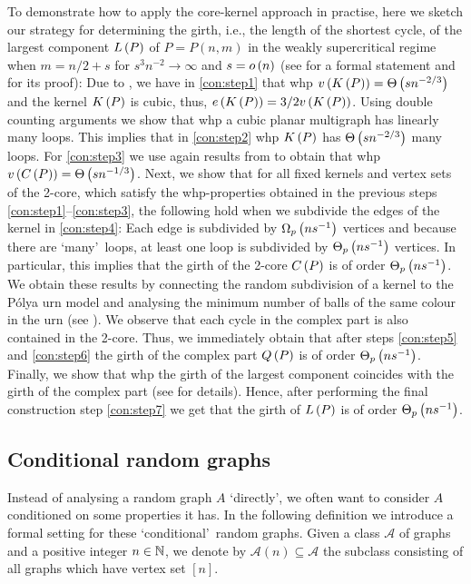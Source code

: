 To demonstrate how to apply the core-kernel approach in practise, here we sketch our strategy for determining the girth, i.e., the length of the shortest cycle, of the largest component $L\left(P\right)$ of $P=P(n,m)$ in the weakly supercritical regime when $m=n/2+s$ for $s^3n^{-2}\to \infty$ and $s=o\left(n\right)$ (see  for a formal statement and  for its proof): Due to \cite{KangLuczak2012,KangMosshammerSpruessel2020}, we have in \ref{con:step1} that whp $v\left({K\left(P\right)}\right)=\Theta\left(sn^{-2/3}\right)$ and the kernel $K\left(P\right)$ is cubic, thus, $e\left({K\left(P\right)}\right)=3/2v\left({K\left(P\right)}\right)$. Using double counting arguments we show that whp a cubic planar multigraph has linearly many loops. This implies that in \ref{con:step2} whp $K\left(P\right)$ has $\Theta\left(sn^{-2/3}\right)$ many loops. For \ref{con:step3} we use again results from \cite{KangLuczak2012,KangMosshammerSpruessel2020} to obtain that whp $v\left({C\left(P\right)}\right)=\Theta\left(sn^{-1/3}\right)$. Next, we show that for all fixed kernels and vertex sets of the 2-core, which satisfy the whp-properties obtained in the previous steps \ref{con:step1}--\ref{con:step3}, the following hold when we subdivide the edges of the kernel in \ref{con:step4}: Each edge is subdivided by $\Omega_p\left(ns^{-1}\right)$ vertices and because there are \lq many\rq\ loops, at least one loop is subdivided by $\Theta_p\left(ns^{-1}\right)$ vertices. In particular, this implies that the girth of the 2-core $C\left(P\right)$ is of order $\Theta_p\left(ns^{-1}\right)$. We obtain these results by connecting the random subdivision of a kernel to the P\'olya urn model and analysing the minimum number of balls of the same colour in the urn (see ). We observe that each cycle in the complex part is also contained in the 2-core. Thus, we immediately obtain that after steps \ref{con:step5} and \ref{con:step6} the girth of the complex part $Q\left(P\right)$ is of order $\Theta_p\left(ns^{-1}\right)$. Finally, we show that whp the girth of the largest component coincides with the girth of the complex part (see  for details). Hence, after performing the final construction step \ref{con:step7} we get that the girth of $L\left(P\right)$ is of order $\Theta_p\left(ns^{-1}\right)$.

\subsection{Conditional random graphs}\label{sub:conditional_random_graphs}
Instead of analysing a random graph $A$ \lq directly\rq, we often want to consider $A$ conditioned on some properties it has. In the following definition we introduce a formal setting for these \lq conditional\rq\ random graphs. Given a class $\mathcal{A}$ of graphs and a positive integer $n\in\mathbb{N}$, we denote by $\mathcal{A}(n)\subseteq\mathcal{A}$ the subclass consisting of all graphs which have vertex set $[n]$.

